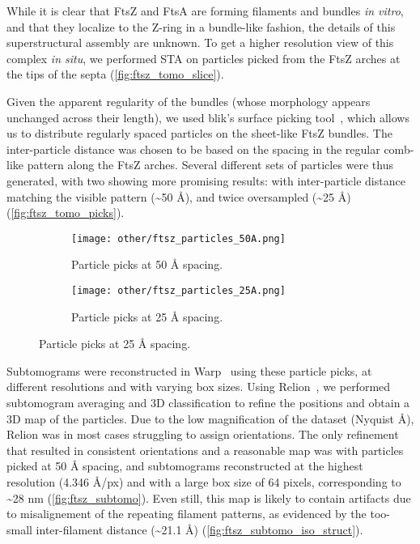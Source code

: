 While it is clear that FtsZ and FtsA are forming filaments and bundles \textit{in vitro}, and that they localize to the Z-ring in a bundle-like fashion, the details of this superstructural assembly are unknown.
To get a higher resolution view of this complex \textit{in situ}, we performed STA on particles picked from the FtsZ arches at the tips of the septa (\autoref{fig:ftsz_tomo_slice}).

Given the apparent regularity of the bundles (whose morphology appears unchanged across their length), we used blik's surface picking tool~\cite{gaifasBlikExtensible3D2024,gaifasBlikPythonTool2024}, which allows us to distribute regularly spaced particles on the sheet-like FtsZ bundles.
The inter-particle distance was chosen to be based on the spacing in the regular comb-like pattern along the FtsZ arches.
Several different sets of particles were thus generated, with two showing more promising results: with inter-particle distance matching the visible pattern (\sim50 Å), and twice oversampled (\sim25 Å) (\autoref{fig:ftsz_tomo_picks}).

\begin{figure}[ht]
    \centering
    \begin{subfigure}[B]{.49\textwidth}
        \centering
        \texttt{[image: other/ftsz\_particles\_50A.png]}
        \caption{Particle picks at 50 Å spacing.}
        \label{fig:ftsz_tomo_picks_50}
    \end{subfigure}%
    \hfill
    \begin{subfigure}[B]{.49\textwidth}
        \centering
        \texttt{[image: other/ftsz\_particles\_25A.png]}
        \caption{Particle picks at 25 Å spacing.}
        \label{fig:ftsz_tomo_picks_25}
    \end{subfigure}%
    \label{fig:ftsz_tomo_picks}
\end{figure}

Subtomograms were reconstructed in Warp~\cite{tegunovRealtimeCryoelectronMicroscopy2019} using these particle picks, at different resolutions and with varying box sizes.
Using Relion~\cite{scheresRELIONImplementationBayesian2012,zivanovBayesianApproachSingleparticle2022,burtImageProcessingPipeline2024}, we performed subtomogram averaging and 3D classification to refine the positions and obtain a 3D map of the particles.
Due to the low magnification of the dataset (Nyquist  Å), Relion was in most cases struggling to assign orientations.
The only refinement that resulted in consistent orientations and a reasonable map was with particles picked at 50 Å spacing, and subtomograms reconstructed at the highest resolution (4.346 Å/px) and with a large box size of 64 pixels, corresponding to \sim28 nm (\autoref{fig:ftsz_subtomo}).
Even still, this map is likely to contain artifacts due to misalignement of the repeating filament patterns, as evidenced by the too-small inter-filament distance (\sim21.1 Å) (\autoref{fig:ftsz_subtomo_iso_struct}).

